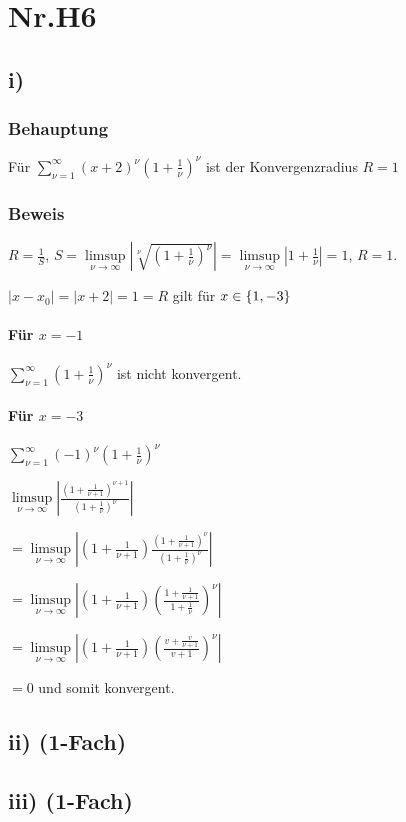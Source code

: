 \section*{Nr.H6}

\subsection*{i)}

\subsubsection*{Behauptung}

Für $\sum\limits^{\infty}_{\nu = 1} (x+2)^{\nu} (1+\frac{1}{\nu})^{\nu}$ ist der Konvergenzradius $R = 1$ 

\subsubsection*{Beweis}

$ R = \frac{1}{S}$,
$S = \limsup\limits_{\nu \to \infty} |\sqrt[\nu]{(1 + \frac{1}{\nu})^{\nu}}|
= \limsup\limits_{\nu \to \infty} |1 + \frac{1}{\nu}|
= 1 $,
$R = 1$.

$|x-x_{0}| = |x+2| = 1 = R$ gilt für $ x \in \{\-1,-3\}$

\paragraph*{Für $x = -1$}

$\sum\limits^{\infty}_{\nu = 1}(1+\frac{1}{\nu})^{\nu}$ ist nicht konvergent.


\paragraph*{Für $x = -3$}

$\sum\limits^{\infty}_{\nu = 1}(-1)^{\nu}(1+\frac{1}{\nu})^{\nu}$

$\limsup\limits_{\nu \to \infty} |\frac{(1+\frac{1}{\nu+1})^{\nu+1}}{(1+\frac{1}{\nu})^{\nu}}|$

$=\limsup\limits_{\nu \to \infty} |(1+\frac{1}{\nu+1})\frac{(1+\frac{1}{\nu+1})^{\nu}}{(1+\frac{1}{\nu})^{\nu}}|$

$=\limsup\limits_{\nu \to \infty} |(1+\frac{1}{\nu+1})(\frac{1+\frac{1}{\nu+1}}{1+\frac{1}{\nu}})^{\nu}|$

$=\limsup\limits_{\nu \to \infty} |(1+\frac{1}{\nu+1})(\frac{v+\frac{v}{\nu+1}}{v+1})^{\nu}|$

$ = 0$ und somit konvergent.


\subsection*{ii) (1-Fach)}

\subsection*{iii) (1-Fach)}
